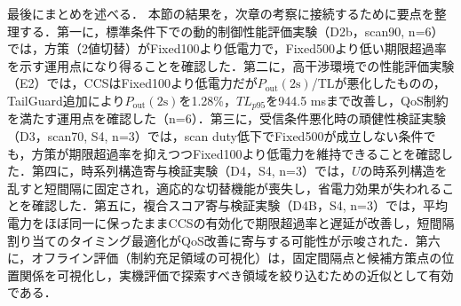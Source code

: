 最後にまとめを述べる．
本節の結果を，次章の考察に接続するために要点を整理する．第一に，標準条件下での動的制御性能評価実験（D2b，scan90, n=6）では，方策（2値切替）がFixed100より低電力で，Fixed500より低い期限超過率を示す運用点になり得ることを確認した．第二に，高干渉環境での性能評価実験（E2）では，CCSはFixed100より低電力だが$P_{\mathrm{out}}(2\mathrm{s})$/TLが悪化したものの，TailGuard追加により$P_{\mathrm{out}}(2\mathrm{s})$を1.28\%，$TL_{p95}$を944.5 msまで改善し，QoS制約を満たす運用点を確認した（n=6）．第三に，受信条件悪化時の頑健性検証実験（D3，scan70, S4, n=3）では，scan duty低下でFixed500が成立しない条件でも，方策が期限超過率を抑えつつFixed100より低電力を維持できることを確認した．第四に，時系列構造寄与検証実験（D4，S4, n=3）では，$U$の時系列構造を乱すと短間隔に固定され，適応的な切替機能が喪失し，省電力効果が失われることを確認した．第五に，複合スコア寄与検証実験（D4B，S4, n=3）では，平均電力をほぼ同一に保ったままCCSの有効化で期限超過率と遅延が改善し，短間隔割り当てのタイミング最適化がQoS改善に寄与する可能性が示唆された．第六に，オフライン評価（制約充足領域の可視化）は，固定間隔点と候補方策点の位置関係を可視化し，実機評価で探索すべき領域を絞り込むための近似として有効である．










